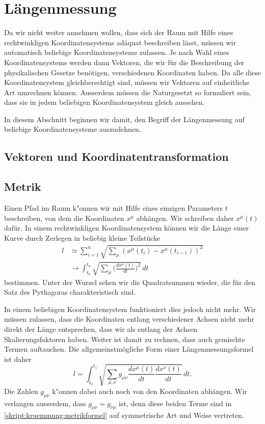 %
%
%
\section{Längenmessung
\label{skript:kruemmung:section:laengenmessung}}
Da wir nicht weiter annehmen wollen, dass sich der Raum mit Hilfe
eines rechtwinkligen Koordinatensystems adäquat beschreiben lässt,
müssen wir automatisch beliebige Koordinatensysteme zulassen.
Je nach Wahl eines Koordinatensystems werden dann Vektoren, die
wir für die Beschreibung der physikalischen Gesetze benötigen,
verschiedenen Koordinaten haben.
Da alle diese Koordinatensystem gleichberechtigt sind, müssen
wir Vektoren auf einheitliche Art umrechnen können.
Ausserdem müssen die Naturgesetzt so formuliert sein, dass
sie in jedem beliebigen Koordinatensystem gleich aussehen.

In diesem Abschnitt beginnen wir damit, den Begriff der Längenmessung
auf beliebige Koordinatensysteme auszudehnen.

\subsection{Vektoren und Koordinatentransformation}

\subsection{Metrik}
Einen Pfad im Raum k"onnen wir mit Hilfe eines einzigen Parameters $t$
beschreiben, von dem die Koordinaten $x^\mu$ abhängen. 
Wir schreiben daher $x^\mu(t)$ dafür.
In einem rechtwinkligen Koordinatensystem können wir die Länge
einer Kurve durch Zerlegen in beliebig kleine Teilstücke 
\begin{align*}
l
&\simeq
\sum_{i=1}^n \sqrt{\sum_{\mu} (x^{\mu}(t_i)-x^{\mu}(t_{i-1}))^2}
\\
&\rightarrow
\int_{t_0}^{t_n} \sqrt{\sum_{\mu}\biggl(\frac{dx^{\mu}(t)}{dt}\biggr)^2}\,dt
\end{align*}
bestimmen.
Unter der Wurzel sehen wir die Quadratsummen wieder, die für den
Satz des Pythagoras charakteristisch sind.

In einem beliebigen Koordinatensystem funktioniert dies jedoch nicht
mehr.
Wir müssen zulassen, dass die Koordinaten entlang verschiedener
Achsen nicht mehr direkt der Länge entsprechen, dass wir als
entlang der Achsen Skalierungsfaktoren haben.
Weiter ist damit zu rechnen, dass auch gemischte Termen auftauchen.
Die allgemeinstmögliche Form einer Längenmessungsformel ist daher
\begin{equation}
l
=
\int_{t_0}^{t_1}
\sqrt{\sum_{\mu,\nu} g_{\mu\nu} \frac{dx^{\mu}(t)}{dt}\frac{dx^{\nu}(t)}{dt}}\,dt.
\label{skript:kruemmung:metrikformel}
\end{equation}
Die Zahlen $g_{\mu\nu}$ k"onnen dabei auch noch von den Koordinaten
abhängen.
Wir verlangen ausserdem, dass $g_{\mu\nu}=g_{\nu\mu}$ ist, denn
diese beiden Terme sind in \eqref{skript:kruemmung:metrikformel}
auf symmetrische Art und Weise vertreten.

